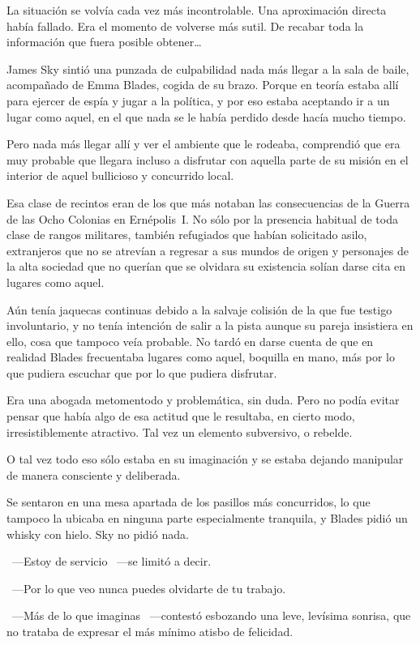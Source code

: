 \noindent
La situación se volvía cada vez más incontrolable. Una aproximación directa había fallado. Era el momento de volverse más sutil. De recabar toda la información que fuera posible obtener\dots

\parbreak\noindent
James Sky sintió una punzada de culpabilidad nada más llegar a la sala de baile, acompañado de Emma Blades, cogida de su brazo. Porque en teoría estaba allí para ejercer de espía y jugar a la política, y por eso estaba aceptando ir a un lugar como aquel, en el que nada se le había perdido desde hacía mucho tiempo.

Pero nada más llegar allí y ver el ambiente que le rodeaba, comprendió que era muy probable que llegara incluso a disfrutar con aquella parte de su misión en el interior de aquel bullicioso y concurrido local.

Esa clase de recintos eran de los que más notaban las consecuencias de la Guerra de las Ocho Colonias en Ernépolis~I. No sólo por la presencia habitual de toda clase de rangos militares, también refugiados que habían solicitado asilo, extranjeros que no se atrevían a regresar a sus mundos de origen y personajes de la alta sociedad que no querían que se olvidara su existencia solían darse cita en lugares como aquel.

Aún tenía jaquecas continuas debido a la salvaje colisión de la que fue testigo involuntario, y no tenía intención de salir a la pista aunque su pareja insistiera en ello, cosa que tampoco veía probable. No tardó en darse cuenta de que en realidad Blades frecuentaba lugares como aquel, boquilla en mano, más por lo que pudiera escuchar que por lo que pudiera disfrutar.

Era una abogada metomentodo y problemática, sin duda. Pero no podía evitar pensar que había algo de esa actitud que le resultaba, en cierto modo, irresistiblemente atractivo. Tal vez un elemento subversivo, o rebelde.

O tal vez todo eso sólo estaba en su imaginación y se estaba dejando manipular de manera consciente y deliberada.

Se sentaron en una mesa apartada de los pasillos más concurridos, lo que tampoco la ubicaba en ninguna parte especialmente tranquila, y Blades pidió un whisky con hielo. Sky no pidió nada.

~---Estoy de servicio ~---se limitó a decir.

~---Por lo que veo nunca puedes olvidarte de tu trabajo.

~---Más de lo que imaginas ~---contestó esbozando una leve, levísima sonrisa, que no trataba de expresar el más mínimo atisbo de felicidad.


